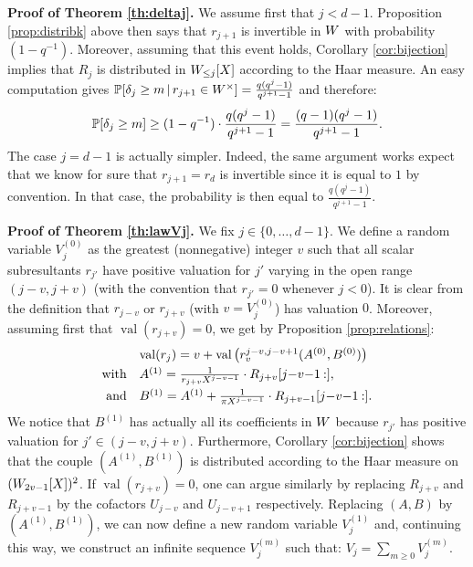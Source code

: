 \documentclass{sig-alternate}
\DeclareMathOperator{\val}{val}
\begin{document}
\noindent
\textbf{Proof of Theorem \ref{th:deltaj}.}
We assume first that $j < d-1$. Proposition \ref{prop:distribk} above 
then says that $r_{j+1}$ is invertible in $\A$ with probability 
$(1 - q^{-1})$. Moreover, assuming that this event holds, Corollary 
\ref{cor:bijection} implies that $R_j$ is distributed in $\A_{\leq 
j}[X]$ according to the Haar measure. An easy computation gives
$\P[\delta_j \geq m\,|\, r_{j+1} \in \A^\times ] =
\frac{q(q^j - 1)}{q^{j+1}-1}$
and therefore:
$$\P[\delta_j \geq m] \geq (1 - q^{-1}) \cdot
\frac{q(q^j - 1)}{q^{j+1}-1} =
\frac{(q-1)(q^j - 1)}{q^{j+1}-1}.$$
The case $j = d-1$ is actually simpler. Indeed, the same argument works 
expect that we know for sure that $r_{j+1} = r_d$ is invertible since it 
is equal to $1$ by convention. In that case, the probability is then 
equal to $\frac{q(q^j - 1)}{q^{j+1}-1}$.

\medskip

\noindent
\textbf{Proof of Theorem \ref{th:lawVj}.}
We fix $j \in \{0, \ldots, d-1\}$. 
We define a random variable $V_j^{(0)}$ as the greatest (nonnegative) 
integer $v$ such that all scalar subresultants $r_{j'}$ have positive 
valuation for $j'$ varying in the open range $(j-v, j+v)$ (with the
convention that $r_{j'} = 0$ whenever $j < 0$). It is clear from the 
definition that $r_{j-v}$ or $r_{j+v}$ (with $v = V_j^{(0)}$) has 
valuation $0$. Moreover, assuming first that $\val(r_{j+v}) = 0$, we 
get by Proposition \ref{prop:relations}:
$$\begin{array}{rl}
& \val(r_j) = v + \val\big(r_v^{j-v,j-v+1}(A^{(0)}, B^{(0)})\big) 
\smallskip \\
\text{with} &
A^{(1)} = \frac 1 {r_{j+v} X^{j-v-1}} \cdot R_{j+v}[j{-}v{-}1\:{:}], \smallskip \\
\text{and} &
B^{(1)} = A^{(1)} + \frac 1 {\pi X^{j-v-1}} \cdot R_{j+v-1}[j{-}v{-}1\:{:}].
\end{array}$$
We notice that $B^{(1)}$ has actually all its coefficients in $\A$ 
because $r_{j'}$ has positive valuation for $j' \in (j-v, j+v)$.
Furthermore, Corollary \ref{cor:bijection} shows that the 
couple $(A^{(1)}, B^{(1)})$ is distributed according to the Haar measure 
on $(\A_{2v-1}[X])^2$. If $\val(r_{j+v}) = 0$, one can argue similarly 
by replacing $R_{j+v}$ and $R_{j+v-1}$ by the cofactors $U_{j-v}$ and 
$U_{j-v+1}$ respectively. Replacing $(A,B)$ by $(A^{(1)}, B^{(1)})$, we 
can now define a new random variable $V_j^{(1)}$ and, continuing this 
way, we construct an infinite sequence $V_j^{(m)}$ such that:
$V_j = \sum_{m \geq 0} V_j^{(m)}$.
\end{document}
